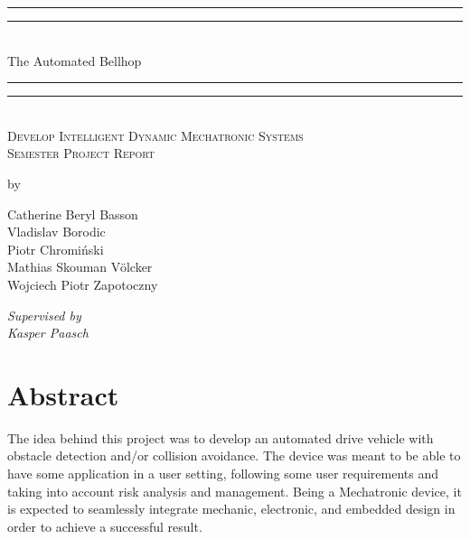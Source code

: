 \documentclass[11pt]{article}
\begin{document}
{
  \thispagestyle{empty}

\centering %
\vspace*{\baselineskip} %

\rule{\textwidth}{1.6pt}\vspace*{-\baselineskip}\vspace*{2pt} %
\rule{\textwidth}{0.4pt}\\[\baselineskip] %

{\LARGE The Automated Bellhop}\\[0.2\baselineskip] %

\rule{\textwidth}{0.4pt}\vspace*{-\baselineskip}\vspace{3.2pt} %
\rule{\textwidth}{1.6pt}\\[\baselineskip] %

\scshape %
Develop Intelligent Dynamic Mechatronic Systems\\Semester Project Report\\[\baselineskip] %

\vspace*{2\baselineskip} %

by \\[\baselineskip]
{\Large Catherine Beryl Basson \\ Vladislav Borodic \\ Piotr Chromi\'nski \\ Mathias Skouman V\"olcker \\ Wojciech Piotr Zapotoczny \\\par} %
{\vspace{5pt} \itshape Supervised by \\ Kasper Paasch\par} %
}
\newpage
{}
\section{Abstract}
The idea behind this project was to develop an automated drive vehicle with obstacle detection and/or collision avoidance. The device was meant to be able to have some application in a user setting, following some user requirements and taking into account risk analysis and management. Being a Mechatronic device, it is expected to seamlessly integrate mechanic, electronic, and embedded design in order to achieve a successful result.
\end{document}
